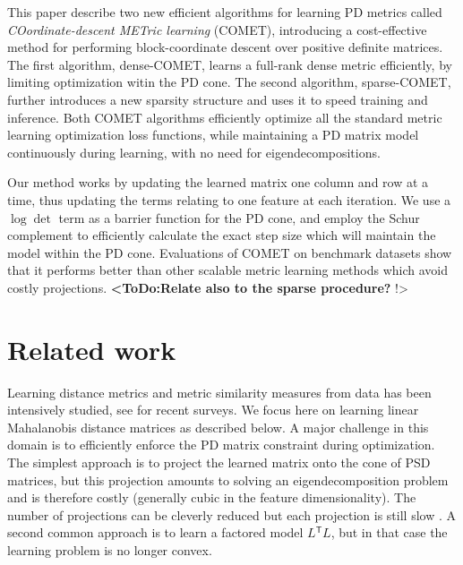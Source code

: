 \documentclass[twoside,11pt]{article}
\newcommand\todo[1]{\textbf{<ToDo:#1}!>}
\newcommand\mat[1]{{#1}}
\newcommand{\T}{{}^\mathsf{T}}
\newcommand{\ignore}[1]{}
\newcommand{\cholL}{\mat{L}}
\begin{document}
This paper describe two new efficient algorithms for learning PD metrics called {\em{COordinate-descent METric learning}} (COMET), introducing a cost-effective method for performing block-coordinate descent over positive definite matrices. The first algorithm, dense-COMET, learns a full-rank dense metric efficiently, by limiting optimization witin the PD cone. The second algorithm, sparse-COMET, further introduces a new sparsity structure and uses it to speed training and inference. Both COMET algorithms  efficiently optimize all the standard metric learning optimization loss functions, while maintaining a PD matrix model continuously during learning, with no need for eigendecompositions. 

Our method works by updating the learned matrix one column and row at a time, thus updating the terms relating to one feature at each iteration. We use a $\log \det$ term as a barrier function for the PD cone, and employ the Schur complement to efficiently calculate the exact step size which will maintain the model within the PD cone. Evaluations of COMET on benchmark datasets show that it performs better than other scalable metric learning methods which avoid costly projections. \todo{Relate also to the sparse procedure? }

\ignore{Furthermore an important challenge for metric learning is the case where the set of features is not fixed in advance, but changes with time. This is a typical scenario in many real life applications of learning: as more data accumulates, it is possible to estimate more parameters accurately, so more features and signals are gradually added to existing systems. It is therefore desirable to develop algorithms that can learn metrics in face of a growing feature set. Our method naturally adapts to this setting, by optimizing the metric matrix one column-row at a time.}

\section{Related work}
Learning distance metrics and metric similarity measures from data has been intensively studied, see \citet{bellet2013survey, kulis2012survey} for recent surveys. We focus here on learning linear Mahalanobis distance matrices as described below. A major challenge in this domain is to efficiently enforce the PD matrix constraint during optimization. The simplest approach is to project the learned matrix onto the cone of PSD matrices, but this projection amounts to solving an eigendecomposition problem and is therefore costly (generally cubic in the feature dimensionality). The number of projections can be cleverly reduced but each projection is still slow \citep{qianHD, qian}. A second common approach is to learn a factored model $\cholL\T \cholL$, but in that case the learning problem is no longer convex. 
\end{document}
